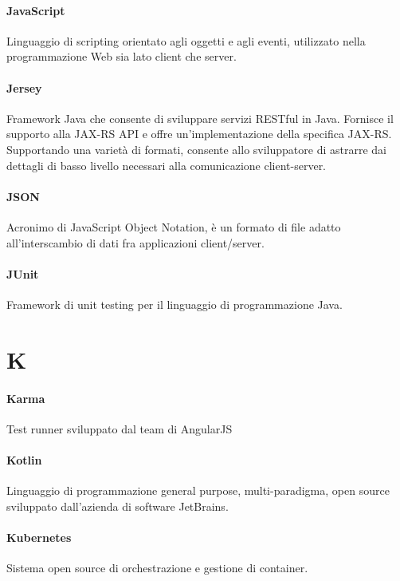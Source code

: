 \documentclass[]{article}
\begin{document}
	\paragraph*{JavaScript}
	Linguaggio di scripting orientato agli oggetti e agli eventi, utilizzato nella programmazione Web sia lato client che server.

	\paragraph*{Jersey}
	Framework Java che consente di sviluppare servizi RESTful in Java. Fornisce il supporto alla JAX-RS API e offre un’implementazione della specifica JAX-RS. Supportando una varietà di formati, consente allo sviluppatore di astrarre dai dettagli di basso livello necessari alla comunicazione client-server.

    \paragraph*{JSON}
    Acronimo di JavaScript Object Notation, è un formato di file adatto all'interscambio di dati fra applicazioni client/server.

	\paragraph*{JUnit}
	Framework di unit testing per il linguaggio di programmazione Java.

	\newpage

	\section*{K}

	\paragraph*{Karma}
	Test runner sviluppato dal team di AngularJS

	\paragraph*{Kotlin}
	Linguaggio di programmazione general purpose, multi-paradigma, open source sviluppato dall'azienda di software JetBrains.

	\paragraph*{Kubernetes}
	Sistema open source di orchestrazione e gestione di container.
\end{document}
